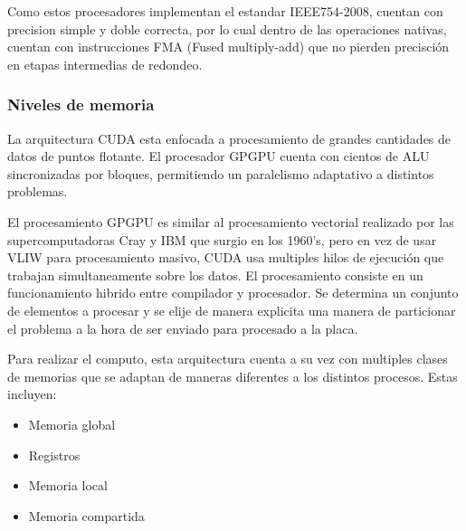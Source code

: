 Como estos procesadores implementan el estandar IEEE754-2008, cuentan con precision simple y
doble correcta, por lo cual dentro de las operaciones nativas, cuentan con instrucciones FMA
(Fused multiply-add) que no pierden precisci\'on en etapas intermedias de redondeo.



\subsubsection{Niveles de memoria}

La arquitectura CUDA esta enfocada a procesamiento de grandes cantidades de datos
de puntos flotante. El procesador GPGPU cuenta con cientos de ALU sincronizadas
por bloques, permitiendo un paralelismo adaptativo a distintos problemas.

El procesamiento GPGPU es similar al procesamiento vectorial
realizado por las supercomputadoras Cray y IBM que surgio en los 1960's, pero
en vez de usar VLIW para procesamiento masivo, CUDA usa multiples hilos de ejecuci\'on
que trabajan simultaneamente sobre los datos.
El procesamiento consiste en un funcionamiento hibrido entre compilador y procesador. Se determina
un conjunto de elementos a procesar y se elije de manera explicita una manera de particionar el
problema a la hora de ser enviado para procesado a la placa.


Para realizar el computo, esta arquitectura cuenta a su vez con multiples clases de memorias
que se adaptan de maneras diferentes a los distintos procesos. Estas incluyen:

\begin{itemize}
  \item Memoria global
  \item Registros
  \item Memoria local
  \item Memoria compartida
\end{itemize}

